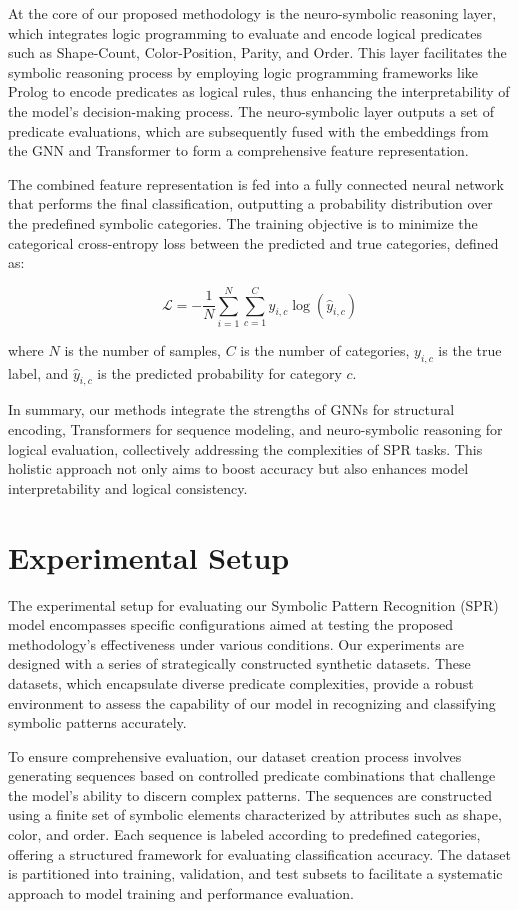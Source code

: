 \documentclass{article}
\begin{document}
At the core of our proposed methodology is the neuro-symbolic reasoning layer, which integrates logic programming to evaluate and encode logical predicates such as Shape-Count, Color-Position, Parity, and Order. This layer facilitates the symbolic reasoning process by employing logic programming frameworks like Prolog to encode predicates as logical rules, thus enhancing the interpretability of the model’s decision-making process. The neuro-symbolic layer outputs a set of predicate evaluations, which are subsequently fused with the embeddings from the GNN and Transformer to form a comprehensive feature representation.

The combined feature representation is fed into a fully connected neural network that performs the final classification, outputting a probability distribution over the predefined symbolic categories. The training objective is to minimize the categorical cross-entropy loss between the predicted and true categories, defined as:

\[
\mathcal{L} = -\frac{1}{N} \sum_{i=1}^{N} \sum_{c=1}^{C} y_{i,c} \log(\hat{y}_{i,c})
\]

where \( N \) is the number of samples, \( C \) is the number of categories, \( y_{i,c} \) is the true label, and \( \hat{y}_{i,c} \) is the predicted probability for category \( c \).

In summary, our methods integrate the strengths of GNNs for structural encoding, Transformers for sequence modeling, and neuro-symbolic reasoning for logical evaluation, collectively addressing the complexities of SPR tasks. This holistic approach not only aims to boost accuracy but also enhances model interpretability and logical consistency.

\section{Experimental Setup}
The experimental setup for evaluating our Symbolic Pattern Recognition (SPR) model encompasses specific configurations aimed at testing the proposed methodology's effectiveness under various conditions. Our experiments are designed with a series of strategically constructed synthetic datasets. These datasets, which encapsulate diverse predicate complexities, provide a robust environment to assess the capability of our model in recognizing and classifying symbolic patterns accurately.

To ensure comprehensive evaluation, our dataset creation process involves generating sequences based on controlled predicate combinations that challenge the model's ability to discern complex patterns. The sequences are constructed using a finite set of symbolic elements characterized by attributes such as shape, color, and order. Each sequence is labeled according to predefined categories, offering a structured framework for evaluating classification accuracy. The dataset is partitioned into training, validation, and test subsets to facilitate a systematic approach to model training and performance evaluation.
\end{document}
